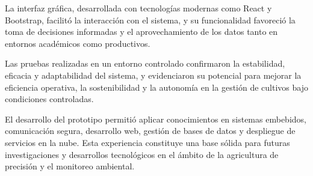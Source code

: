 La interfaz gráfica, desarrollada con tecnologías modernas como React y
Bootstrap, facilitó la interacción con el sistema, y su funcionalidad favoreció
la toma de decisiones informadas y el aprovechamiento de los datos tanto en
entornos académicos como productivos.

Las pruebas realizadas en un entorno controlado confirmaron la estabilidad,
eficacia y adaptabilidad del sistema, y evidenciaron su potencial para mejorar
la eficiencia operativa, la sostenibilidad y la autonomía en la gestión de
cultivos bajo condiciones controladas.

El desarrollo del prototipo permitió aplicar conocimientos en sistemas
embebidos, comunicación segura, desarrollo web, gestión de bases de datos y
despliegue de servicios en la nube. Esta experiencia constituye una base sólida
para futuras investigaciones y desarrollos tecnológicos en el ámbito de la
agricultura de precisión y el monitoreo ambiental.




